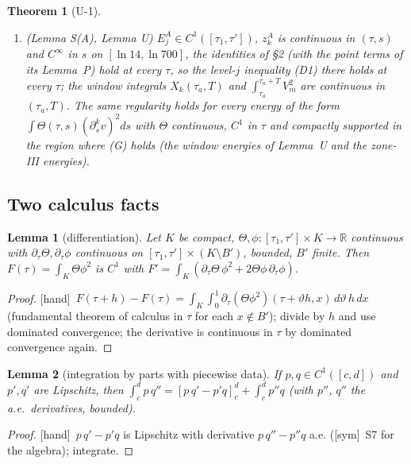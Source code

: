 \documentclass[11pt]{article}
\newtheorem{lemma}{Lemma}\newtheorem{proposition}{Proposition}\newtheorem{remark}{Remark}\newtheorem{theorem}{Theorem}\newtheorem{definition}{Definition}
\newcommand{\fn}[1]{\texttt{\detokenize{#1}}}
\newcommand{\tH}{\textup{[hand]}}\newcommand{\tS}{\textup{[sym]}}\newcommand{\tR}{\textup{[read]}}\newcommand{\tL}{\textup{[Lean]}}\newcommand{\tD}{\textup{[DKS]}}\newcommand{\tI}{\textup{[inh]}}
\begin{document}
\begin{theorem}[U-1]
\begin{enumerate}[label=(\alph*),leftmargin=2em]
\item \emph{(Lemma S(A), Lemma U)} $E^A_j\in C^1([\tau_1,\tau'])$, $z^A_k$ is continuous in $(\tau,s)$ and $C^\infty$ in $s$ on $[\ln14,\ln700]$, the identities of \fn{lemmaS_A_v33.tex} \S2 (with the point terms of its Lemma~P) hold at every $\tau$, so the level-$j$ inequality (D1) there holds at every $\tau$; the window integrals $X_k(\tau_a,T)$ and $\int_{\tau_a}^{\tau_a+T}V_m^2$ are continuous in $(\tau_a,T)$. The same regularity holds for every energy of the form $\int\Theta(\tau,s)(\partial_s^kv)^2ds$ with $\Theta$ continuous, $C^1$ in $\tau$ and compactly supported in the region where (G) holds (the window energies of Lemma~U and the zone-III energies).
\end{enumerate}
\end{theorem}

\subsection{Two calculus facts}
\begin{lemma}[differentiation]\label{U:lem:leib}
Let $K$ be compact, $\Theta,\phi:[\tau_1,\tau']\times K\to\mathbb R$ continuous with $\partial_\tau\Theta,\partial_\tau\phi$ continuous on $[\tau_1,\tau']\times(K\setminus B')$, bounded, $B'$ finite. Then $F(\tau)=\int_K\Theta\phi^2$ is $C^1$ with $F'=\int_K(\partial_\tau\Theta\,\phi^2+2\Theta\phi\,\partial_\tau\phi)$.
\end{lemma}
\begin{proof}\tH\ $F(\tau+h)-F(\tau)=\int_K\int_0^1\partial_\tau(\Theta\phi^2)(\tau+\vartheta h,x)\,d\vartheta\,h\,dx$ (fundamental theorem of calculus in $\tau$ for each $x\notin B'$); divide by $h$ and use dominated convergence; the derivative is continuous in $\tau$ by dominated convergence again.
\end{proof}
\begin{lemma}[integration by parts with piecewise data]\label{U:lem:ibp}
If $p,q\in C^1([c,d])$ and $p',q'$ are Lipschitz, then $\int_c^dp\,q''=[p\,q'-p'q]_c^d+\int_c^dp''q$ (with $p''$, $q''$ the a.e.\ derivatives, bounded).
\end{lemma}
\begin{proof}\tH\ $p\,q'-p'q$ is Lipschitz with derivative $p\,q''-p''q$ a.e. (\tS\ S7 for the algebra); integrate.
\end{proof}
\end{document}
